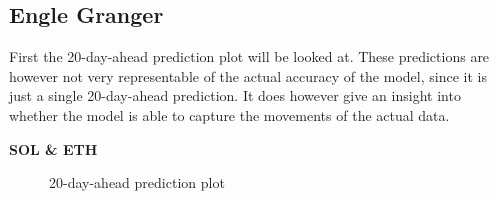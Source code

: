 \subsection{Engle Granger}
First the 20-day-ahead prediction plot will be looked at. These predictions are however not very representable of the actual accuracy of the model, since it is just a single 20-day-ahead prediction. It does however give an insight into whether the model is able to capture the movements of the actual data.\\
\begin{center}
    \textbf{SOL \& ETH}
\end{center}
\begin{figure}[H]
  \centering
  \quad
  \caption{20-day-ahead prediction plot}
  \label{fig:SOL_ETH_20_DAY_plot}
\end{figure}
